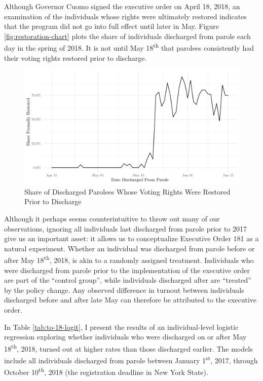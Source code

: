 \documentclass[12pt,]{article}
\begin{document}
Although Governor Cuomo signed the executive order on April 18, 2018, an examination of the individuals whose rights were ultimately restored indicates that the program did not go into full effect until later in May. Figure \ref{fig:restoration-chart} plots the share of individuals discharged from parole each day in the spring of 2018. It is not until May 18\textsuperscript{th} that parolees consistently had their voting rights restored prior to discharge.

\begin{figure}[H]

{\centering \includegraphics{felony_disenfranchisement_nys_files/figure-latex/restoration-chart-chunk-1} 

}

\caption{\label{fig:restoration-chart}Share of Discharged Parolees Whose Voting Rights Were Restored Prior to Discharge}\label{fig:restoration-chart-chunk}
\end{figure}

Although it perhaps seems counterintuitive to throw out many of our observations, ignoring all individuals last discharged from parole prior to 2017 give us an important asset: it allows us to conceptualize Executive Order 181 as a natural experiment. Whether an individual was discharged from parole before or after May 18\textsuperscript{th}, 2018, is akin to a randomly assigned treatment. Individuals who were discharged from parole prior to the implementation of the executive order are part of the ``control group'', while individuals discharged after are ``treated'' by the policy change. Any observed difference in turnout between individuals discharged before and after late May can therefore be attributed to the executive order.

In Table \ref{tab:to-18-logit}, I present the results of an individual-level logistic regression exploring whether individuals who were discharged on or after May 18\textsuperscript{th}, 2018, turned out at higher rates than those discharged earlier. The models include all individuals discharged from parole between January 1\textsuperscript{st}, 2017, through October 10\textsuperscript{th}, 2018 (the registration deadline in New York State).
\end{document}
